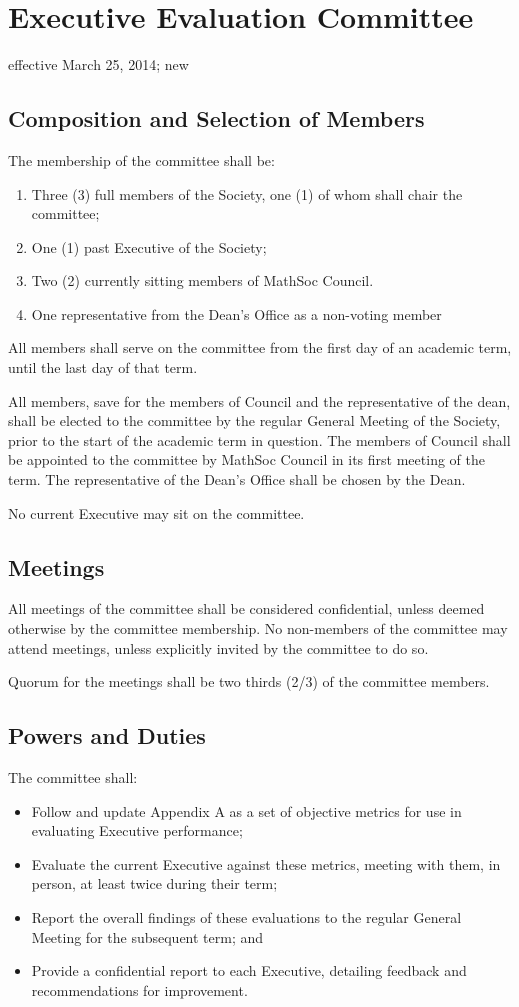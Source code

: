 \section{Executive Evaluation Committee}
effective March 25, 2014; new

\subsection{Composition and Selection of Members}
The membership of the committee shall be:
\begin{enumerate}
\item Three (3) full members of the Society, one (1) of whom shall chair the committee;
\item One (1) past Executive of the Society;
\item Two (2) currently sitting members of MathSoc Council.
\item One representative from the Dean’s Office as a non-voting member
\end{enumerate}

All members shall serve on the committee from the first day of an academic term, until the last day of that term.

All members, save for the members of Council and the representative of the dean, shall be elected to the committee by the regular General Meeting of the Society, prior to the start of the academic term in question. The members of Council shall be appointed to the committee by MathSoc Council in its first meeting of the term. The representative of the Dean’s Office shall be chosen by the Dean.

No current Executive may sit on the committee.

\subsection{Meetings}

All meetings of the committee shall be considered confidential, unless deemed otherwise by the committee membership. No non-members of the committee may attend meetings, unless explicitly invited by the committee to do so.

Quorum for the meetings shall be two thirds (2/3) of the committee members.

\subsection{Powers and Duties}

The committee shall:
\begin{itemize}
\item Follow and update Appendix A as a set of objective metrics for use in evaluating Executive performance;
\item Evaluate the current Executive against these metrics, meeting with them, in person, at least twice during their term;
\item Report the overall findings of these evaluations to the regular General Meeting for the subsequent term;
and
\item Provide a confidential report to each Executive, detailing feedback and recommendations for improvement.
\end{itemize}
